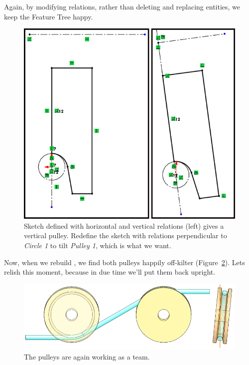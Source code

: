 Again, by modifying
relations, rather than deleting and replacing entities, we keep the Feature Tree
happy.

\begin{figure}[H]
\begin{center}
\includegraphics{images/figures/tilt-pulley-relations.png}
\end{center}
\caption{Sketch defined with horizontal and vertical relations (left) gives a vertical
  pulley. Redefine the sketch with relations perpendicular to \emph{Circle 1} to tilt
  \emph{Pulley 1}, which is what we want.
\label{fig:tilt-pulley-relations}}

\end{figure}

Now, when we rebuild , we find both pulleys happily
off-kilter (Figure~\ref{fig:completed-non-orthogonal2}). Lets relish this
moment, because in due time we'll put them back upright.

\begin{figure}[H]
\begin{center}
  \includegraphics[width=5in]{images/figures/completed-non-orthogonal2.png}
\end{center}
\caption{The pulleys are again working as a team.
\label{fig:completed-non-orthogonal2}}

\end{figure}

